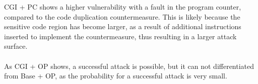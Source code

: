 CGI + PC shows a higher vulnerability with a fault in the program counter, compared to the code duplication countermeasure. This is likely because the sensitive code region has become larger, as a result of additional instructions inserted to implement the countermeasure, thus resulting in a larger attack surface.\\\\
As CGI + OP shows, a successful attack is possible, but it can not differentiated from Base + OP, as the probability for a successful attack is very small.